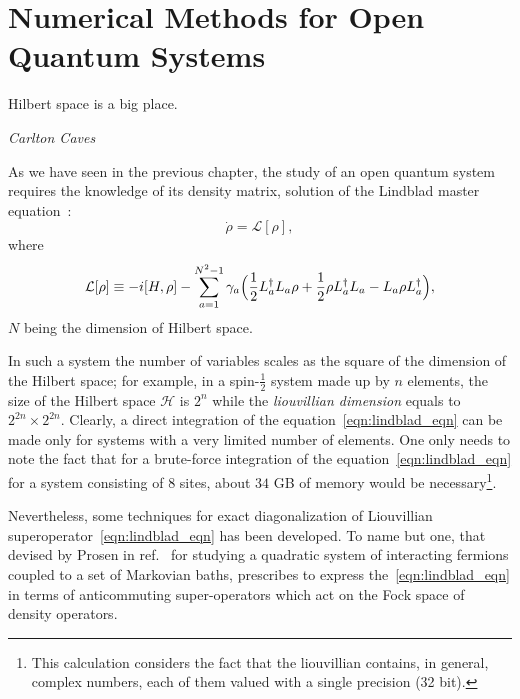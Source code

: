 \chapter{Numerical Methods for Open Quantum Systems}
\label{Chapter2}
\epigraph{Hilbert space is a big place.}{\textit{Carlton Caves}}
As we have seen in the previous chapter, the study of an open quantum system requires the knowledge of its density matrix, solution of the Lindblad master equation~\cite{presk:quant_info}:
\begin{equation*}
    \dot{\rho} = \mathcal{L}[\rho],
\end{equation*}
where
\begin{equation}
\label{eqn:lindblad_eqn}
    \mathcal{L}[\rho] \equiv -i[H, \rho] - \sum_{a=1}^{N^2-1}\gamma_a\Bigl(\frac{1}{2}L_a^{\dagger}L_a\rho + \frac{1}{2}\rho L_a^{\dagger}L_a - L_a\rho L_a^{\dagger}\Bigl),
\end{equation}
$N$ being the dimension of Hilbert space.

In such a system the number of variables scales as the square of the dimension of the Hilbert space; for example, in a spin-$\frac{1}{2}$ system made up by $n$ elements, the size of the Hilbert space $\mathcal{H}$ is $2^n$ while the \emph{liouvillian dimension} equals to $2^{2n} \times 2^{2n}$. Clearly, a direct integration of the equation~\ref{eqn:lindblad_eqn} can be made only for systems with a very limited number of elements. One only needs to note the fact that for a brute-force integration of the equation~\ref{eqn:lindblad_eqn} for a system consisting of $8$ sites, about $34$ GB of memory would be necessary\footnote{This calculation considers the fact that the liouvillian contains, in general, complex numbers, each of them valued with a single precision (32 bit).}.

Nevertheless, some techniques for exact diagonalization of Liouvillian superoperator~\ref{eqn:lindblad_eqn} has been developed. To name but one, that devised by Prosen in ref.~\cite{Prosen_2008} for studying a quadratic system of interacting fermions coupled to a set of Markovian baths, prescribes to express the~\ref{eqn:lindblad_eqn} in terms of anticommuting super-operators which act on the Fock space of density operators. 

